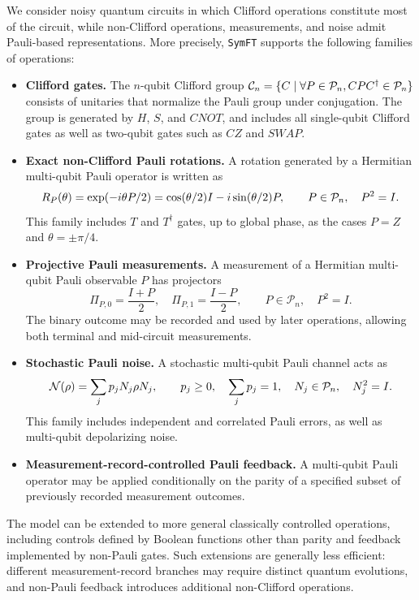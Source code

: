 \documentclass[a4paper,onecolumn,unpublished]{quantumarticle}
\DeclarePairedDelimiter\rbra{\lparen}{\rparen}
\DeclarePairedDelimiter\cbra{\{}{\}}
\newcommand{\tFont}[1]{\texttt{#1}}
\newcommand{\symft}{\tFont{SymFT}}
\newcommand{\cnot}{\ensuremath{\mathit{CNOT}}}
\newcommand{\cz}{\ensuremath{\mathit{CZ}}}
\renewcommand{\swap}{\ensuremath{\mathit{SWAP}}}
\newcommand{\cC}{\mathcal{C}}
\newcommand{\cN}{\mathcal{N}}
\newcommand{\cP}{\mathcal{P}}
\begin{document}
We consider noisy quantum circuits in which Clifford operations constitute most of the circuit, while non-Clifford operations, measurements, and noise admit Pauli-based representations.
More precisely, \symft{} supports the following families of operations:
\begin{itemize}
    \item \textbf{Clifford gates.}
    The $n$-qubit Clifford group $\cC_n = \cbra{C  \mid \forall P \in \cP_n, CPC^{\dagger} \in \cP_n}$ consists of unitaries that normalize the Pauli group under conjugation. The group is generated by $H$, $S$, and $\cnot{}$, and includes all single-qubit Clifford gates as well as two-qubit gates such as $\cz{}$ and $\swap{}$.
    \item \textbf{Exact non-Clifford Pauli rotations.}
    A rotation generated by a Hermitian multi-qubit Pauli operator is written as
    \begin{equation*}
        R_P\rbra{\theta} = \exp\rbra*{-i\theta P/2} = \cos\rbra{\theta/2} I - i\sin\rbra{\theta/2} P, \qquad P \in \cP_n,\quad P^2=I.
    \end{equation*}
    This family includes $T$ and $T^\dagger$ gates, up to global phase, as the cases $P=Z$ and $\theta=\pm\pi/4$.
    \item \textbf{Projective Pauli measurements.}
    A measurement of a Hermitian multi-qubit Pauli observable $P$ has projectors
    \begin{equation*}
        \Pi_{P,0} = \frac{I+P}{2}, \quad \Pi_{P,1} = \frac{I-P}{2}, \qquad P \in \cP_n,\quad P^2=I.
    \end{equation*}
    The binary outcome may be recorded and used by later operations, allowing both terminal and mid-circuit measurements.
    \item \textbf{Stochastic Pauli noise.}
    A stochastic multi-qubit Pauli channel acts as
    \begin{equation*}
        \cN\rbra{\rho} = \sum_j p_j N_j \rho N_j, \qquad p_j \geq 0,\quad \sum_j p_j = 1, \quad N_j \in \cP_n, \quad N_j^2=I.
    \end{equation*}
    This family includes independent and correlated Pauli errors, as well as multi-qubit depolarizing noise.
    \item \textbf{Measurement-record-controlled Pauli feedback.}
    A multi-qubit Pauli operator may be applied conditionally on the parity of a specified subset of previously recorded measurement outcomes.
\end{itemize}
The model can be extended to more general classically controlled operations, including controls defined by Boolean functions other than parity and feedback implemented by non-Pauli gates.
Such extensions are generally less efficient: different measurement-record branches may require distinct quantum evolutions, and non-Pauli feedback introduces additional non-Clifford operations.
\end{document}
